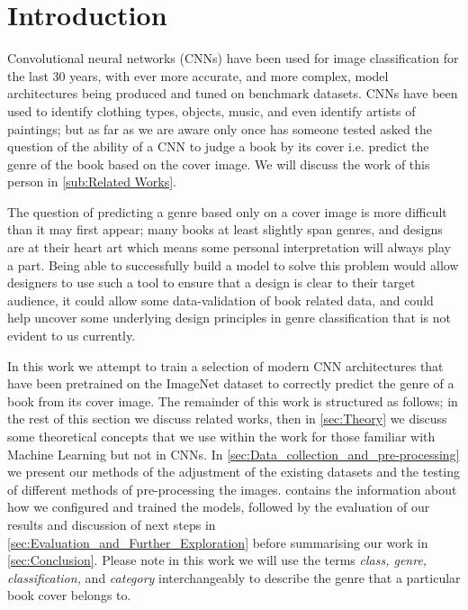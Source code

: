 \documentclass[12pt]{article}
\numberwithin{equation}{section}
\numberwithin{figure}{section}
\begin{document}
\clearpage
%
{\hypersetup{linkcolor=black}
\tableofcontents}
\thispagestyle{empty}
\clearpage
%
\setcounter{page}{1}
\section{Introduction} 
\label{sec:intro}
Convolutional neural networks (CNNs) have been used for image classification for the last 30 years\cite{Cun1989}, with ever more accurate, and more complex, model architectures being produced and tuned on benchmark datasets. CNNs have been used to identify clothing types, objects, music, and even identify artists of paintings; but as far as we are aware only once has someone tested asked the question of the ability of a CNN to judge a book by its cover i.e. predict the genre of the book based on the cover image. We will discuss the work of this person in \cref{sub:Related Works}. 

The question of predicting a genre based only on a cover image is more difficult than it may first appear; many books at least slightly span genres, and designs are at their heart art which means some personal interpretation will always play a part. Being able to successfully build a model to solve this problem would allow designers to use such a tool to ensure that a design is clear to their target audience, it could allow some data-validation of book related data, and could help uncover some underlying design principles in genre classification that is not evident to us currently. 

In this work we attempt to train a selection of modern CNN architectures that have been pretrained on the ImageNet dataset to correctly predict the genre of a book from its cover image. The remainder of this work is structured as follows; in the rest of this section we discuss related works, then in \cref{sec:Theory} we discuss some theoretical concepts that we use within the work for those familiar with Machine Learning but not in CNNs. In \cref{sec:Data_collection_and_pre-processing} we present our methods of the adjustment of the existing datasets and the testing of different methods of pre-processing the images.  contains the information about how we configured and trained the models, followed by the evaluation of our results and discussion of next steps in \cref{sec:Evaluation_and_Further_Exploration} before summarising our work in \cref{sec:Conclusion}. Please note in this work we will use the terms \emph{class, genre, classification,} and \emph{category} interchangeably to describe the genre that a particular book cover belongs to.
\end{document}
